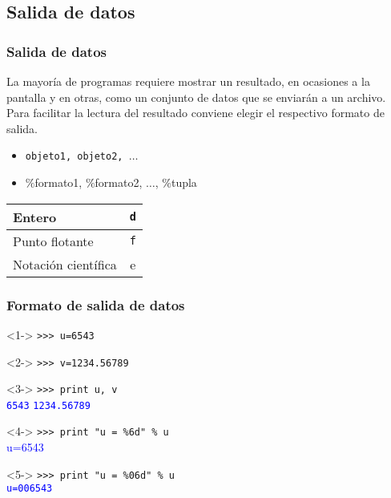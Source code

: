 \documentclass[12pt]{beamer}
\begin{document}
\subsection{Salida de datos}
\begin{frame}
\frametitle{Salida de datos}
La mayor\'{i}a de programas requiere mostrar un resultado, en ocasiones a la pantalla y en otras, como un conjunto de datos que se enviar\'{a}n a un archivo.
\\
\bigskip
Para facilitar la lectura del resultado conviene elegir el respectivo formato de salida.
\begin{itemize}
\item \texttt{objeto1, objeto2, $\ldots$}
\item $\%$formato1, $\%$formato2, $\ldots$, $\%$tupla
\end{itemize}
\begin{center}
\begin{tabular}{l | c}
\hline Entero & \texttt{d} \\
\hline Punto flotante & \texttt{f} \\
\hline Notaci\'{o}n cient\'{i}fica & e
\end{tabular}
\end{center}
\end{frame}
\begin{frame}[fragile]
\frametitle{Formato de salida de datos}
\fontsize{12}{12}\selectfont
\begin{exampleblock}{}<1->
	\verb|>>> u=6543|
\end{exampleblock}
\begin{exampleblock}{}<2->
	\verb|>>> v=1234.56789|
\end{exampleblock}
\begin{exampleblock}{}<3->
	\verb|>>> print u, v| \\
	\pause
	\textcolor{blue}{\texttt{6543}  \texttt{1234.56789}}
\end{exampleblock}
\begin{exampleblock}{}<4->
	\verb|>>> print "u = %6d" % u| \\
	\pause
	\textcolor{blue}{u=6543}
\end{exampleblock}
\begin{exampleblock}{}<5->
	\verb|>>> print "u = %06d" % u| \\
	\pause
	\textcolor{blue}{\texttt{u=006543}}
\end{exampleblock}
\end{frame}
\end{document}
